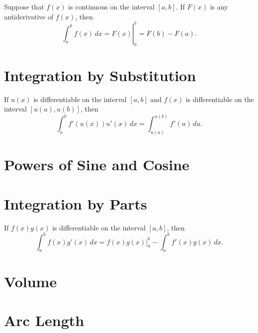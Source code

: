 \documentclass{ximera}
\renewcommand{\d}{\,d}
\begin{document}
\begin{theorem}
\label{thm:fundamental_theorem_II}\hfil
\noindent Suppose that $f(x)$ is continuous on the interval $[a,b]$. If $F(x)$
is any antiderivative of $f(x)$, then
\[
\left.\int_a^b f(x)\d x = F(x) \right|_a^b = F(b)-F(a).
\]
\end{theorem}






\section*{Integration by Substitution}







\begin{theorem}
If $u(x)$ is differentiable on the interval $[a,b]$ and $f(x)$ is
differentiable on the interval $[u(a),u(b)]$, then
\[
\int_a^b f'(u(x)) u'(x) \d x =\int_{u(a)}^{u(b)} f'(u) \d u.
\]
\end{theorem}







\section*{Powers of Sine and Cosine}








\section*{Integration by Parts}







\begin{theorem}
If $f(x)g(x)$ is differentiable on the interval $[a,b]$, then
\[
\int_a^b f(x) g'(x) \d x =f(x)g(x) \bigg|_a^b - \int_a^b f'(x) g(x) \d x.
\]
\end{theorem}





\section*{Volume}







\section*{Arc Length}
\end{document}
